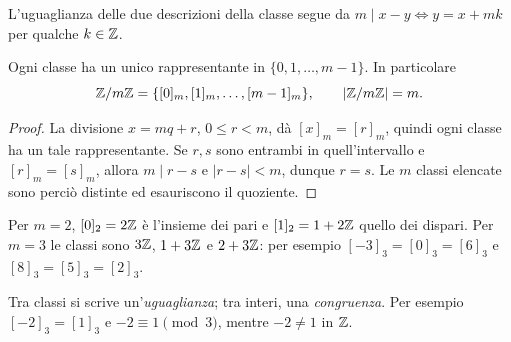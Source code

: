 L'uguaglianza delle due descrizioni della classe segue da $m\mid x-y\iff y=x+mk$ per qualche $k\in\mathbb{Z}$.

\begin{proposizione}
Ogni classe ha un unico rappresentante in $\{0,1,\ldots,m-1\}$. In particolare
\[
\mathbb{Z}/m\mathbb{Z}=\{[0]_m,[1]_m,\ldots,[m-1]_m\},\qquad |\mathbb{Z}/m\mathbb{Z}|=m.
\]
\end{proposizione}
\begin{proof}
La divisione $x=mq+r$, $0\le r<m$, dà $[x]_m=[r]_m$, quindi ogni classe ha un tale rappresentante. Se $r,s$ sono entrambi in quell'intervallo e $[r]_m=[s]_m$, allora $m\mid r-s$ e $|r-s|<m$, dunque $r=s$. Le $m$ classi elencate sono perciò distinte ed esauriscono il quoziente.
\end{proof}

\begin{esempio}
Per $m=2$, $[0]_2=2\mathbb{Z}$ è l'insieme dei pari e $[1]_2=1+2\mathbb{Z}$ quello dei dispari. Per $m=3$ le classi sono $3\mathbb{Z}$, $1+3\mathbb{Z}$ e $2+3\mathbb{Z}$: per esempio $[-3]_3=[0]_3=[6]_3$ e $[8]_3=[5]_3=[2]_3$.
\end{esempio}

\begin{schema}
\end{schema}

\begin{osservazione}
Tra classi si scrive un'\emph{uguaglianza}; tra interi, una \emph{congruenza}. Per esempio $[-2]_3=[1]_3$ e $-2\equiv1\pmod3$, mentre $-2\ne1$ in $\mathbb{Z}$.
\end{osservazione}

